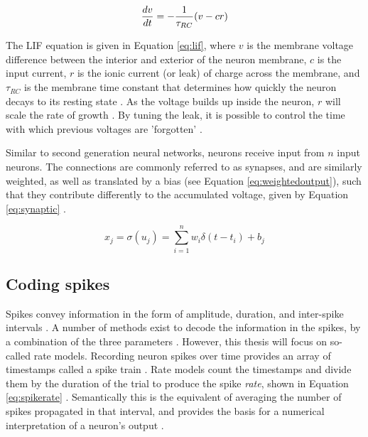 \documentclass[report.tex]{subfiles}
\begin{document}
\begin{equation}
  \frac{dv}{dt} = - {1 \over \tau_{RC}} (v - cr)
  \label{eq:lif}
\end{equation}

The LIF equation is given in Equation \ref{eq:lif}, where
$v$ is the membrane voltage difference between the interior
and exterior of the neuron membrane, $c$ is the input current, $r$
is the ionic current (or leak) of charge across the membrane, and
$\tau_{RC}$ is the membrane time constant that determines how
quickly the neuron decays to its resting state \cite{Dayan2001, Eliasmith2004}.
As the voltage builds up inside the neuron, $r$ will scale the
rate of growth \cite{Eliasmith2004}.
By tuning the leak, it is possible to control the time with which
previous voltages are 'forgotten' \cite{Eliasmith2004}.

Similar to second generation neural networks, neurons
receive input from $n$ input neurons.
The connections are commonly referred to as synapses, and are similarly
weighted, as well as translated by a bias (see Equation \ref{eq:weightedoutput}),
such that they contribute differently to the accumulated 
voltage, given by Equation \ref{eq:synaptic} \cite{Dayan2001}.

\begin{equation}
  x_j = \sigma(u_j) = \sum_{i=1}^n{w_i\delta(t - t_i)} + b_j
  \label{eq:synaptic}
\end{equation}

\subsection{Coding spikes} \label{sec:coding}
Spikes convey information in the form of amplitude, duration, and
inter-spike intervals \cite{Dayan2001}.
A number of methods exist to decode the information in the spikes, by a 
combination of the three parameters \cite{Dayan2001, Eliasmith2015, Diehl2015, Rueckauer2017}.
However, this thesis will
focus on so-called rate models.
Recording neuron spikes over time provides an array of timestamps called a
spike train \cite{Eliasmith2015}.
Rate models count the timestamps and divide them by the duration of
the trial to produce the spike \textit{rate}, shown
in Equation \ref{eq:spikerate} \cite{Dayan2001, Eliasmith2004}.
Semantically this is the equivalent of averaging the number of spikes propagated
in that interval, and provides the basis for a numerical interpretation of a
neuron's output \cite{Eliasmith2004}.
\end{document}
